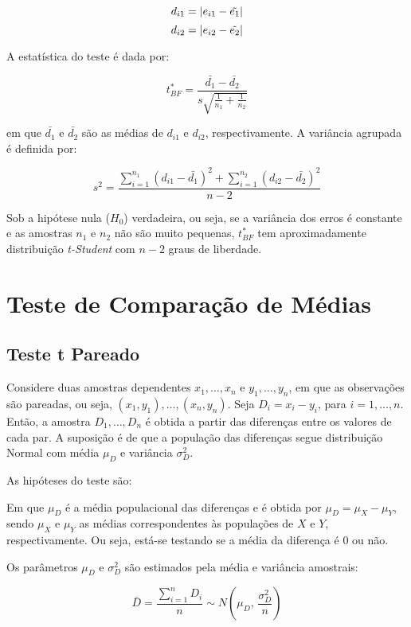 \documentclass[
  portuguese,
]{estat/estat}
\let\oldsection\section
\renewcommand\section{\clearpage\oldsection}
\begin{document}
\[ d_{i1} = |e_{i1} - \Tilde{e_1}| \]
\[ d_{i2} = |e_{i2} - \Tilde{e_2}| \]

A estatística do teste é dada por:

\[ t^*_{BF} = \frac{\bar{d_1} - \bar{d_2}}{s\sqrt{\frac{1}{n_1} + \frac{1}{n_2}}} \]

em que \(\bar{d_1}\) e \(\bar{d_2}\) são as médias de \(d_{i1}\) e
\(d_{i2}\), respectivamente. A variância agrupada é definida por:

\[ s^2 = \frac{\displaystyle \sum_{i=1}^{n_1}(d_{i1} - \bar{d_1})^2 + \displaystyle \sum_{i=1}^{n_2}(d_{i2} - \bar{d_2})^2}{n - 2} \]

Sob a hipótese nula (\(H_0\)) verdadeira, ou seja, se a variância dos
erros é constante e as amostras \(n_1\) e \(n_2\) não são muito
pequenas, \(t^*_{BF}\) tem aproximadamente distribuição
\textit{t-Student} com \(n - 2\) graus de liberdade.

\section{Teste de Comparação de
Médias}\label{teste-de-comparauxe7uxe3o-de-muxe9dias}

\subsection{Teste t Pareado}\label{teste-t-pareado}

Considere duas amostras dependentes \(x_1, \ldots, x_n\) e
\(y_1, \ldots, y_n\), em que as observações são pareadas, ou seja,
\((x_1, y_1), \ldots, (x_n, y_n)\). Seja \(D_i = x_i - y_i\), para
\(i = 1, \ldots, n\). Então, a amostra \(D_1, \ldots, D_n\) é obtida a
partir das diferenças entre os valores de cada par. A suposição é de que
a população das diferenças segue distribuição Normal com média \(\mu_D\)
e variância \(\sigma_D^2\).

As hipóteses do teste são:


Em que \(\mu_D\) é a média populacional das diferenças e é obtida por
\(\mu_D = \mu_X - \mu_Y\), sendo \(\mu_X\) e \(\mu_Y\) as médias
correspondentes às populações de \(X\) e \(Y\), respectivamente. Ou
seja, está-se testando se a média da diferença é 0 ou não.

Os parâmetros \(\mu_D\) e \(\sigma_D^2\) são estimados pela média e
variância amostrais:

\[\bar{D} = \frac{\displaystyle \sum_{i=1}^{n} D_i}{n} \sim N\left(\mu_D, \, \frac{\sigma_D^2}{n}\right) \]
\end{document}
